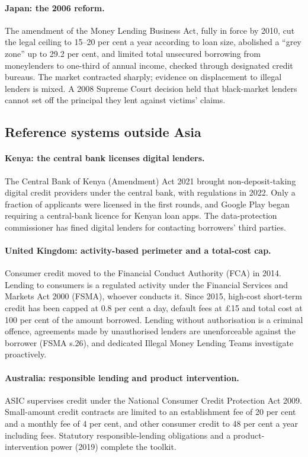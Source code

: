 \documentclass[11pt]{article}
\theoremstyle{plain}
\theoremstyle{definition}
\theoremstyle{remark}
\begin{document}
\paragraph{Japan: the 2006 reform.} The amendment of the Money Lending Business Act, fully in force by 2010, cut the legal ceiling to 15--20 per cent a year according to loan size, abolished a ``grey zone'' up to 29.2 per cent, and limited total unsecured borrowing from moneylenders to one-third of annual income, checked through designated credit bureaus. The market contracted sharply; evidence on displacement to illegal lenders is mixed. A 2008 Supreme Court decision held that black-market lenders cannot set off the principal they lent against victims' claims.

\subsection{Reference systems outside Asia}

\paragraph{Kenya: the central bank licenses digital lenders.} The Central Bank of Kenya (Amendment) Act 2021 brought non-deposit-taking digital credit providers under the central bank, with regulations in 2022. Only a fraction of applicants were licensed in the first rounds, and Google Play began requiring a central-bank licence for Kenyan loan apps. The data-protection commissioner has fined digital lenders for contacting borrowers' third parties.

\paragraph{United Kingdom: activity-based perimeter and a total-cost cap.} Consumer credit moved to the Financial Conduct Authority (FCA) in 2014. Lending to consumers is a regulated activity under the Financial Services and Markets Act 2000 (FSMA), whoever conducts it. Since 2015, high-cost short-term credit has been capped at 0.8 per cent a day, default fees at \pounds 15 and total cost at 100 per cent of the amount borrowed. Lending without authorisation is a criminal offence, agreements made by unauthorised lenders are unenforceable against the borrower (FSMA s.26), and dedicated Illegal Money Lending Teams investigate proactively.

\paragraph{Australia: responsible lending and product intervention.} ASIC supervises credit under the National Consumer Credit Protection Act 2009. Small-amount credit contracts are limited to an establishment fee of 20 per cent and a monthly fee of 4 per cent, and other consumer credit to 48 per cent a year including fees. Statutory responsible-lending obligations and a product-intervention power (2019) complete the toolkit.
\end{document}
